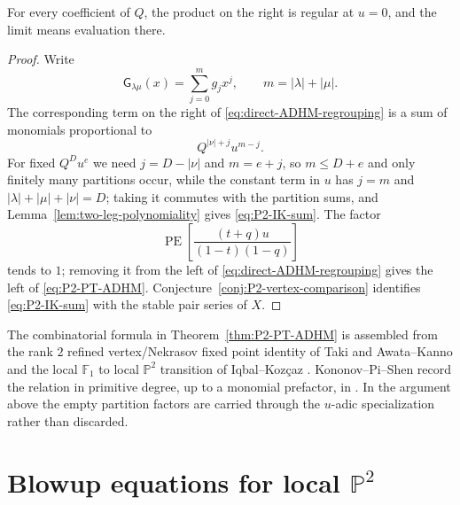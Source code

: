 \documentclass{amsart}
\theoremstyle{definition}
\numberwithin{equation}{section}
\newcommand{\PE}{\operatorname{PE}}
\begin{document}
For every coefficient of \(Q\), the product on the right is regular at \(u=0\), and the limit means evaluation there.

\begin{proof}
Write
\[
 \mathsf G_{\lambda\mu}(x)=\sum_{j=0}^m g_jx^j,
 \qquad m=|\lambda|+|\mu|.
\]
The corresponding term on the right of \eqref{eq:direct-ADHM-regrouping} is a sum of monomials proportional to
\[
 Q^{|\nu|+j}u^{m-j}.
\]
For fixed \(Q^D u^e\) we need \(j=D-|\nu|\) and \(m=e+j\), so \(m\leq D+e\) and only finitely many partitions occur, while the constant term in \(u\) has \(j=m\) and \(|\lambda|+|\mu|+|\nu|=D\); taking it commutes with the partition sums, and Lemma~\ref{lem:two-leg-polynomiality} gives \eqref{eq:P2-IK-sum}.  The factor
\[
 \PE\left[\frac{(t+q)u}{(1-t)(1-q)}\right]
\]
tends to \(1\); removing it from the left of \eqref{eq:direct-ADHM-regrouping} gives the left of \eqref{eq:P2-PT-ADHM}.  Conjecture~\ref{conj:P2-vertex-comparison} identifies \eqref{eq:P2-IK-sum} with the stable pair series of \(X\).
\end{proof}

The combinatorial formula in Theorem~\ref{thm:P2-PT-ADHM} is assembled from the rank \(2\) refined vertex/Nekrasov fixed point identity of Taki and Awata--Kanno \cite{TakiRefined,AwataKanno} and the local \(\mathbb F_1\) to local \(\mathbb P^2\) transition of Iqbal--Koz\c{c}az \cite{IqbalKozcaz}.  Kononov--Pi--Shen record the relation in primitive degree, up to a monomial prefactor, in \cite[equation~(21)]{KononovPiShen}.  In the argument above the empty partition factors are carried through the \(u\)-adic specialization rather than discarded.

\section{Blowup equations for local \texorpdfstring{\(\mathbb P^2\)}{P2}}
\label{sec:P2-blowup}
\end{document}
